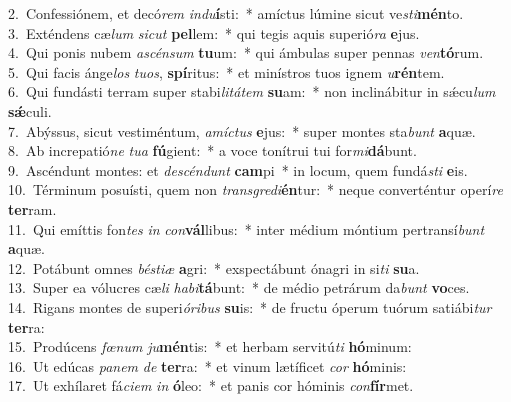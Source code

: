 {2.~}Confessiónem, et decó\textit{rem} \textit{in}\textit{du}\textbf{í}sti:~* amíctus lúmine sicut ve\textit{sti}\textbf{mén}to.\\
{3.~}Exténdens cæ\textit{lum} \textit{si}\textit{cut} \textbf{pel}lem:~* qui tegis aquis superió\textit{ra} \textbf{e}jus.\\
{4.~}Qui ponis nubem \textit{a}\textit{scén}\textit{sum} \textbf{tu}um:~* qui ámbulas super pennas \textit{ven}\textbf{tó}rum.\\
{5.~}Qui facis ánge\textit{los} \textit{tu}\textit{os}, \textbf{spí}ritus:~* et minístros tuos ignem \textit{u}\textbf{rén}tem.\\
{6.~}Qui fundásti terram super stabi\textit{li}\textit{tá}\textit{tem} \textbf{su}am:~* non inclinábitur in sǽcu\textit{lum} \textbf{sǽ}culi.\\
{7.~}Abýssus, sicut vestiméntum, \textit{a}\textit{mí}\textit{ctus} \textbf{e}jus:~* super montes sta\textit{bunt} \textbf{a}quæ.\\
{8.~}Ab increpatió\textit{ne} \textit{tu}\textit{a} \textbf{fú}gient:~* a voce tonítrui tui for\textit{mi}\textbf{dá}bunt.\\
{9.~}Ascéndunt montes: et \textit{de}\textit{scén}\textit{dunt} \textbf{cam}pi~* in locum, quem fundá\textit{sti} \textbf{e}is.\\
{10.~}Términum posuísti, quem non \textit{tran}\textit{sgre}\textit{di}\textbf{én}tur:~* neque converténtur operí\textit{re} \textbf{ter}ram.\\
{11.~}Qui emíttis fon\textit{tes} \textit{in} \textit{con}\textbf{vál}libus:~* inter médium móntium pertransí\textit{bunt} \textbf{a}quæ.\\
{12.~}Potábunt omnes \textit{bé}\textit{sti}\textit{æ} \textbf{a}gri:~* exspectábunt ónagri in si\textit{ti} \textbf{su}a.\\
{13.~}Super ea vólucres cæ\textit{li} \textit{ha}\textit{bi}\textbf{tá}bunt:~* de médio petrárum da\textit{bunt} \textbf{vo}ces.\\
{14.~}Rigans montes de superi\textit{ó}\textit{ri}\textit{bus} \textbf{su}is:~* de fructu óperum tuórum satiábi\textit{tur} \textbf{ter}ra:\\
{15.~}Prodúcens \textit{fœ}\textit{num} \textit{ju}\textbf{mén}tis:~* et herbam servitú\textit{ti} \textbf{hó}minum:\\
{16.~}Ut edúcas \textit{pa}\textit{nem} \textit{de} \textbf{ter}ra:~* et vinum lætíficet \textit{cor} \textbf{hó}minis:\\
{17.~}Ut exhílaret fá\textit{ci}\textit{em} \textit{in} \textbf{ó}leo:~* et panis cor hóminis \textit{con}\textbf{fír}met.\\
